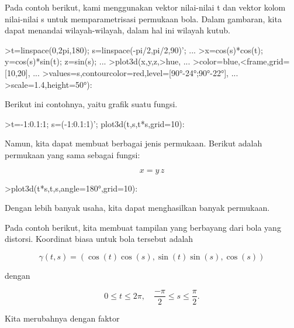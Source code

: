 \documentclass{article}
\begin{document}
\begin{eulernotebook}
\begin{eulercomment}
Pada contoh berikut, kami menggunakan vektor nilai-nilai t dan vektor
kolom nilai-nilai s untuk memparametrisasi permukaan bola. Dalam
gambaran, kita dapat menandai wilayah-wilayah, dalam hal ini wilayah
kutub.
\end{eulercomment}
\begin{eulerprompt}
>t=linspace(0,2pi,180); s=linspace(-pi/2,pi/2,90)'; ...
>x=cos(s)*cos(t); y=cos(s)*sin(t); z=sin(s); ...
>plot3d(x,y,z,>hue, ...
>color=blue,<frame,grid=[10,20], ...
>values=s,contourcolor=red,level=[90°-24°;90°-22°], ...
>scale=1.4,height=50°):
\end{eulerprompt}
\begin{eulercomment}
Berikut ini contohnya, yaitu grafik suatu fungsi.
\end{eulercomment}
\begin{eulerprompt}
>t=-1:0.1:1; s=(-1:0.1:1)'; plot3d(t,s,t*s,grid=10):
\end{eulerprompt}
\begin{eulercomment}
Namun, kita dapat membuat berbagai jenis permukaan. Berikut adalah
permukaan yang sama sebagai fungsi:

\end{eulercomment}
\begin{eulerformula}
\[
x = y \, z
\]
\end{eulerformula}
\begin{eulerprompt}
>plot3d(t*s,t,s,angle=180°,grid=10):
\end{eulerprompt}
\begin{eulercomment}
Dengan lebih banyak usaha, kita dapat menghasilkan banyak permukaan.

Pada contoh berikut, kita membuat tampilan yang berbayang dari bola
yang distorsi. Koordinat biasa untuk bola tersebut adalah

\end{eulercomment}
\begin{eulerformula}
\[
\gamma(t,s) = (\cos(t)\cos(s),\sin(t)\sin(s),\cos(s))
\]
\end{eulerformula}
\begin{eulercomment}
dengan

\end{eulercomment}
\begin{eulerformula}
\[
0 \le t \le 2\pi, \quad \frac{-\pi}{2} \le s \le \frac{\pi}{2}.
\]
\end{eulerformula}
\begin{eulercomment}
Kita merubahnya dengan faktor


\end{eulercomment}
\end{eulernotebook}
\end{document}
